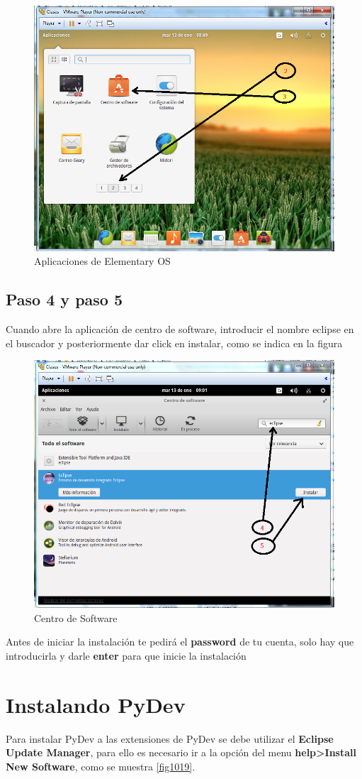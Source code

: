 \documentclass[12pt, twoside]{report}
\begin{document}
\begin{figure}
	\centering
	\includegraphics[width=0.5\linewidth]{Eclipse2y3.png}
	\caption{Aplicaciones de Elementary OS}
	\label{fig1017}
\end{figure}


\subsection{Paso 4 y paso 5}

Cuando abre la aplicación de centro de software, introducir el nombre eclipse en el buscador y posteriormente dar click en instalar, como se indica en la figura

\begin{figure}
	\centering
	\includegraphics[width=0.5\linewidth]{Eclipse4y5.png}
	\caption{Centro de Software}
	\label{fig1018}
\end{figure}

Antes de iniciar la instalación te pedirá el \textbf{password} de tu cuenta, solo hay que introducirla y darle \textbf{enter} para que inicie la instalación

\section{Instalando PyDev}

Para instalar PyDev a las extensiones de PyDev se debe utilizar el \textbf{Eclipse Update Manager}, para ello es necesario ir a la opción del menu \textbf{help>Install New Software}, como se muestra \ref{fig1019}.
\end{document}
